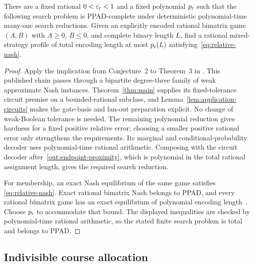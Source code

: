 \begin{corollary}
\label{cor:relative-nash}
There are a fixed rational $0<\varepsilon_{\rm r}<1$ and a fixed polynomial
$p_{\rm r}$ such that the following search problem is PPAD-complete
under deterministic polynomial-time many-one search reductions.
Given an explicitly encoded rational bimatrix game $(A,B)$ with
$A\geq0$, $B\leq0$, and complete binary length $L$, find a rational
mixed-strategy profile of total encoding length at most $p_{\rm r}(L)$
satisfying~\eqref{eq:relative-nash}.
\end{corollary}

\begin{proof}
Apply the implication from Conjecture~2 to Theorem~3 in
\cite[Section~4]{BPR2016}. This published chain passes through a
bipartite degree-three family of weak approximate Nash instances.
Theorem~\ref{thm:main} supplies its fixed-tolerance circuit premise on
a bounded-rational subclass, and Lemma~\ref{lem:application-circuits}
makes the gate-basis and fan-out preparation explicit. No change of
weak-Boolean tolerance is needed. The remaining polynomial reduction
gives hardness for a fixed positive relative error;
choosing a smaller positive rational error only strengthens the
requirements. Its marginal and conditional-probability decoder uses
polynomial-time rational arithmetic. Composing with the circuit
decoder after~\eqref{out:endpoint-proximity}, which is polynomial in
the total rational assignment length, gives the required search
reduction.

For membership, an exact Nash equilibrium of the same game satisfies
\eqref{eq:relative-nash}. Exact rational bimatrix Nash belongs to
PPAD, and every rational bimatrix game has an exact equilibrium of
polynomial encoding length~\cite[Theorem~1.1 and Section~2]{CDT2007Preprint}.
Choose $p_{\rm r}$ to accommodate that bound. The displayed inequalities
are checked by polynomial-time rational arithmetic, so the stated
finite search problem is total and belongs to PPAD.
\end{proof}


\subsection{Indivisible course allocation}

